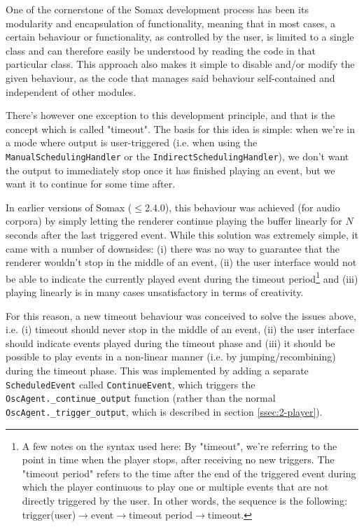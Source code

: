 One of the cornerstone of the Somax development process has been its modularity and encapsulation of functionality, meaning that in most cases, a certain behaviour or functionality, as controlled by the user, is limited to a single class and can therefore easily be understood by reading the code in that particular class. This approach also makes it simple to disable and/or modify the given behaviour, as the code that manages said behaviour self-contained and independent of other modules. 

There's however one exception to this development principle, and that is the concept which is called "timeout". The basis for this idea is simple: when we're in a mode where output is user-triggered (i.e. when using the \texttt{ManualSchedulingHandler} or the \texttt{IndirectSchedulingHandler}), we don't want the output to immediately stop once it has finished playing an event, but we want it to continue for some time after. 

In earlier versions of Somax ($\le$2.4.0), this behaviour was achieved (for audio corpora) by simply letting the renderer continue playing the buffer linearly for $N$ seconds after the last triggered event. While this solution was extremely simple, it came with a number of downsides: (i) there was no way to guarantee that the renderer wouldn't stop in the middle of an event, (ii) the user interface would not be able to indicate the currently played event during the timeout period\footnote{A few notes on the syntax used here: By "timeout", we're referring to the point in time when the player stops, after receiving no new triggers. The "timeout period" refers to the time after the end of the triggered event during which the player continuous to play one or multiple events that are not directly triggered by the user. In other words, the sequence is the following: trigger(user)$\rightarrow$event$\rightarrow$timeout period$\rightarrow$timeout.} and (iii) playing linearly is in many cases unsatisfactory in terms of creativity.

For this reason, a new timeout behaviour was conceived to solve the issues above, i.e. (i) timeout should never stop in the middle of an event, (ii) the user interface should indicate events played during the timeout phase and (iii) it should be possible to play events in a non-linear manner (i.e. by jumping/recombining) during the timeout phase. This was implemented by adding a separate \texttt{ScheduledEvent} called \texttt{ContinueEvent}, which triggers the \texttt{OscAgent.\_continue\_output} function (rather than the normal \texttt{OscAgent.\_trigger\_output}, which is described in section \ref{ssec:2-player}). 


